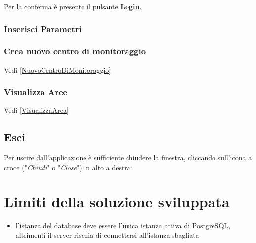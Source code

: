 Per la conferma è presente il pulsante \textbf{Login}.
\subsection{Inserisci Parametri}

\subsection{Crea nuovo centro di monitoraggio}
Vedi \ref{NuovoCentroDiMonitoraggio} 
\subsection{Visualizza Aree}
Vedi \ref{VisualizzaArea}

\section{Esci}
Per uscire dall'applicazione è sufficiente chiudere la finestra, cliccando sull'icona a croce ("\textit{Chiudi}" o "\textit{Close}") in alto a destra:

\chapter{Limiti della soluzione sviluppata}
\begin{itemize}
	\item l'istanza del database deve essere l'unica istanza attiva di PostgreSQL, altrimenti il server rischia di connettersi all'istanza sbagliata
\end{itemize}

\nocite{IuriTex}


